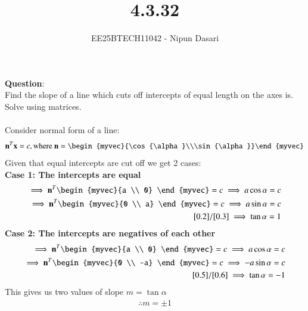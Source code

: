 \documentclass[journal]{IEEEtran}
\begin{document}
	
	
	\vspace{3cm}
	
	\title{4.3.32}
	\author{EE25BTECH11042 - Nipun Dasari}
	\maketitle
		
	\renewcommand{\thefigure}{\theenumi}
	\renewcommand{\thetable}{\theenumi}
	\setlength{\intextsep}{10pt} %
	
	
	\renewcommand{\thetable}{\theenumi}
	
	\textbf{Question}:\\
	Find the slope of a line which cuts off intercepts of equal length on the axes is. Solve using matrices. \\ 
	\solution \\
	
	Consider normal form of a line:
	\begin{align}
		\vec{n}^T\vec{x} = c, \text{where } \vec{n} = \begin{myvec}{\cos{\alpha}\\\sin{\alpha}}\end{myvec}
	\end{align}
	Given that equal intercepts are cut off we get 2 cases:\\
	\textbf{Case 1: The intercepts are equal }
	\begin{align}
		\implies  \vec{n}^T\begin{myvec}{a \\ 0} \end{myvec} = c \implies a\cos{\alpha} = c \label{0.2}\\
		\implies \vec{n}^T\begin{myvec}{0 \\ a} \end{myvec} =c \implies a\sin{\alpha} = c \label{0.3} \\
		\eqref{0.2}/\eqref{0.3} \implies \tan{\alpha} = 1		
	\end{align}
	\textbf{Case 2: The intercepts are negatives of each other }
	\begin{align}
		\implies  \vec{n}^T\begin{myvec}{a \\ 0} \end{myvec} = c \implies a\cos{\alpha} = c \label{0.5}\\
		\implies \vec{n}^T\begin{myvec}{0 \\ -a} \end{myvec} =c \implies -a\sin{\alpha} = c \label{0.6} \\
		\eqref{0.5}/\eqref{0.6} \implies \tan{\alpha} = -1		
	\end{align}
	This gives us two values of slope $m=\tan{\alpha}$
	\begin{align}
		\therefore m = \pm1
	\end{align}
\end{document}

